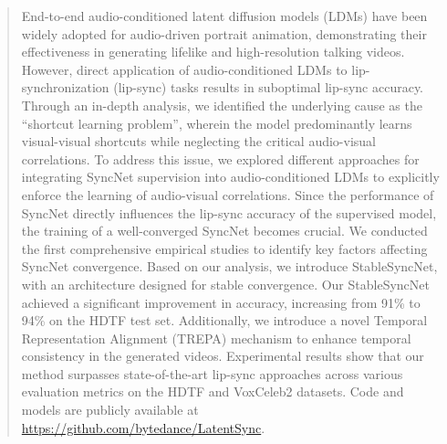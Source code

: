 \begin{abstract}
    End-to-end audio-conditioned latent diffusion models (LDMs) have been widely adopted for audio-driven portrait animation, demonstrating their effectiveness in generating lifelike and high-resolution talking videos. However, direct application of audio-conditioned LDMs to lip-synchronization (lip-sync) tasks results in suboptimal lip-sync accuracy. Through an in-depth analysis, we identified the underlying cause as the ``shortcut learning problem'', wherein the model predominantly learns visual-visual shortcuts while neglecting the critical audio-visual correlations. To address this issue, we explored different approaches for integrating SyncNet supervision into audio-conditioned LDMs to explicitly enforce the learning of audio-visual correlations. Since the performance of SyncNet directly influences the lip-sync accuracy of the supervised model, the training of a well-converged SyncNet becomes crucial. We conducted the first comprehensive empirical studies to identify key factors affecting SyncNet convergence. Based on our analysis, we introduce StableSyncNet, with an architecture designed for stable convergence. Our StableSyncNet achieved a significant improvement in accuracy, increasing from 91\% to 94\% on the HDTF test set. Additionally, we introduce a novel Temporal Representation Alignment (TREPA) mechanism to enhance temporal consistency in the generated videos. Experimental results show that our method surpasses state-of-the-art lip-sync approaches across various evaluation metrics on the HDTF and VoxCeleb2 datasets. Code and models are publicly available at \url{https://github.com/bytedance/LatentSync}.
\end{abstract}
